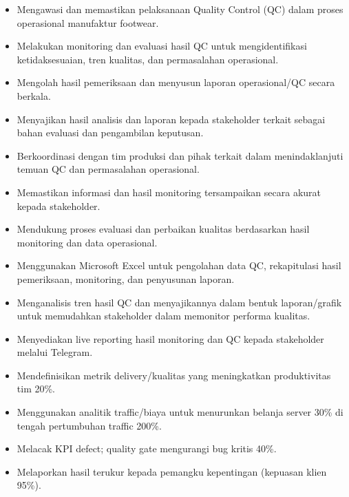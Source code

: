 \begin{itemize}
  \item Mengawasi dan memastikan pelaksanaan Quality Control (QC) dalam proses operasional manufaktur footwear.
  \item Melakukan monitoring dan evaluasi hasil QC untuk mengidentifikasi ketidaksesuaian, tren kualitas, dan permasalahan operasional.
  \item Mengolah hasil pemeriksaan dan menyusun laporan operasional/QC secara berkala.
  \item Menyajikan hasil analisis dan laporan kepada stakeholder terkait sebagai bahan evaluasi dan pengambilan keputusan.
  \item Berkoordinasi dengan tim produksi dan pihak terkait dalam menindaklanjuti temuan QC dan permasalahan operasional.
  \item Memastikan informasi dan hasil monitoring tersampaikan secara akurat kepada stakeholder.
  \item Mendukung proses evaluasi dan perbaikan kualitas berdasarkan hasil monitoring dan data operasional.
  \item Menggunakan Microsoft Excel untuk pengolahan data QC, rekapitulasi hasil pemeriksaan, monitoring, dan penyusunan laporan.
  \item Menganalisis tren hasil QC dan menyajikannya dalam bentuk laporan/grafik untuk memudahkan stakeholder dalam memonitor performa kualitas.
  \item Menyediakan live reporting hasil monitoring dan QC kepada stakeholder melalui Telegram.
\end{itemize}
\vspace{4pt}
\begin{itemize}
  \item Mendefinisikan metrik delivery/kualitas yang meningkatkan produktivitas tim 20\%.
  \item Menggunakan analitik traffic/biaya untuk menurunkan belanja server 30\% di tengah pertumbuhan traffic 200\%.
  \item Melacak KPI defect; quality gate mengurangi bug kritis 40\%.
  \item Melaporkan hasil terukur kepada pemangku kepentingan (kepuasan klien 95\%).
\end{itemize}
